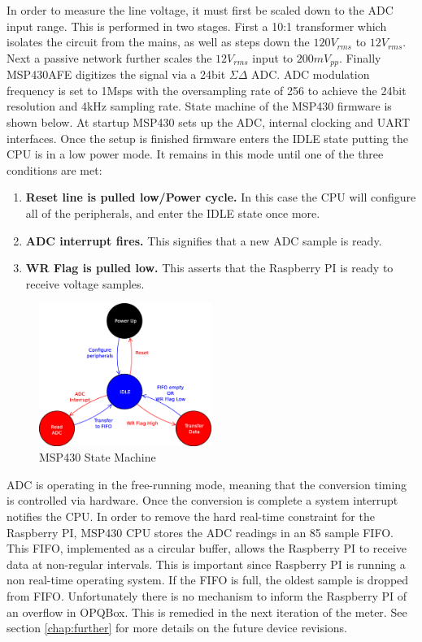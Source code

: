 In order to measure the line voltage, it must first be scaled down to the ADC input range. This is performed in two stages. First a 10:1 transformer which isolates the circuit from the mains, as well as steps down the $120V_{rms}$ to $12V_{rms}$. Next a passive network further scales the $12V_{rms}$ input to $200mV_{pp}$. Finally MSP430AFE digitizes the signal via a 24bit $\Sigma\Delta$ ADC. ADC modulation frequency is set to 1Msps with the oversampling rate of 256 to achieve the 24bit resolution and 4kHz sampling rate. State machine of the MSP430 firmware is shown below. At startup MSP430 sets up the ADC, internal clocking and UART interfaces. Once the setup is finished firmware enters the IDLE state putting the CPU is in a low power mode. It remains in this mode until one of the three conditions are met:

\begin{enumerate}
\item \textbf{Reset line is pulled low/Power cycle.} In this case the CPU will configure all of the peripherals, and enter the IDLE state once more.
\item \textbf{ADC interrupt fires.} This signifies that a new ADC sample is ready.
\item \textbf{WR Flag is pulled low.} This asserts that the Raspberry PI is ready to receive voltage samples.
\end{enumerate}

\begin{figure}[h!]
\centering
\includegraphics[width=0.5\textwidth]{img/MSP430StateMachine.eps}
\caption{MSP430 State Machine}
\end{figure}

ADC is operating in the free-running mode, meaning that the conversion timing is controlled via hardware. Once the conversion is complete a system interrupt notifies the CPU. In order to remove the hard real-time constraint for the Raspberry PI, MSP430 CPU stores the ADC readings in an 85 sample FIFO. This FIFO, implemented as a circular buffer,  allows the Raspberry PI to receive data at non-regular intervals. This is important since Raspberry PI is running a non real-time operating system. If the FIFO is full, the oldest sample is dropped from FIFO. Unfortunately there is no mechanism to inform the Raspberry PI of an overflow in OPQBox. This is remedied in the next iteration of the meter. See section \ref{chap:further} for more details on the future device revisions.

